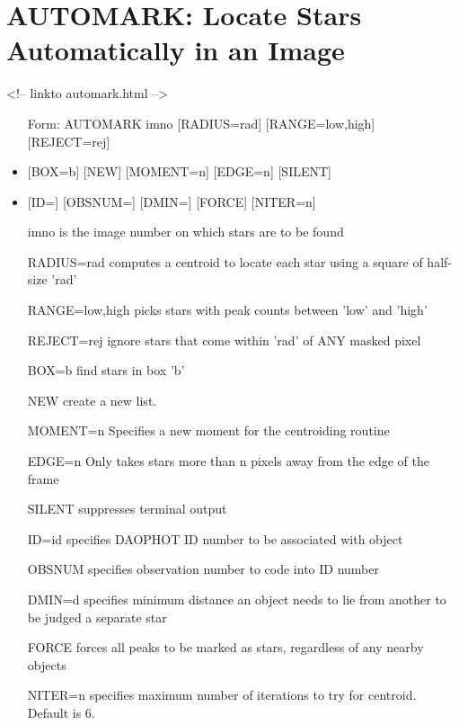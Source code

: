 \section{AUTOMARK: Locate Stars Automatically in an Image}
\begin{rawhtml}
<!-- linkto automark.html -->
\end{rawhtml}
\begin{itemize}
  \item[Form: AUTOMARK imno {[RADIUS=rad]} {[RANGE=low,high]} {[REJECT=rej]}\hfill]{}
  \item{{[BOX=b]} {[NEW]} {[MOMENT=n]} {[EDGE=n]} {[SILENT]}}
  \item{{[ID=]} {[OBSNUM=]} {[DMIN=]} {[FORCE]} {[NITER=n]}}
  \item[imno]{is the image number on which stars are
to be found}
  \item[RADIUS=rad]{computes a centroid to locate each star
using a square of half-size 'rad'}
  \item[RANGE=low,high]{picks stars with peak counts between 'low' and 'high'}
  \item[REJECT=rej]{ignore stars that come within 'rad' of
ANY masked pixel}
  \item[BOX=b]{find stars in box 'b'}
  \item[NEW]{create a new list.}
  \item[MOMENT=n]{Specifies a new moment for the centroiding routine}
  \item[EDGE=n]{Only takes stars more than n pixels away from the edge of the frame}
  \item[SILENT ]{suppresses terminal output}
  \item[ID=id]{specifies DAOPHOT ID number to be associated with object}
  \item[OBSNUM]{specifies observation number to code into ID number}
  \item[DMIN=d]{specifies minimum distance an object needs to
lie from another to be judged a separate star}
  \item[FORCE]{forces all peaks to be marked as stars,
regardless of any nearby objects}
  \item[NITER=n]{specifies maximum number of iterations to try for
centroid. Default is 6.}
\end{itemize}

